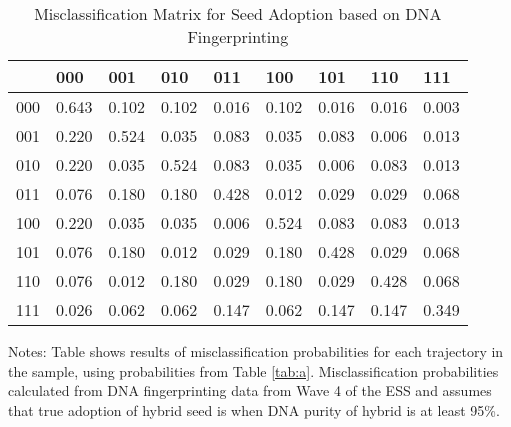 \begin{table}
\caption{Misclassification Matrix for Seed Adoption based on DNA Fingerprinting}
\label{tab:cm}
\centering
\begin{tabular}{lllllllll}
\toprule
 & 000 & 001 & 010 & 011 & 100 & 101 & 110 & 111 \\
\midrule
000 & 0.643 & 0.102 & 0.102 & 0.016 & 0.102 & 0.016 & 0.016 & 0.003 \\
001 & 0.220 & 0.524 & 0.035 & 0.083 & 0.035 & 0.083 & 0.006 & 0.013 \\
010 & 0.220 & 0.035 & 0.524 & 0.083 & 0.035 & 0.006 & 0.083 & 0.013 \\
011 & 0.076 & 0.180 & 0.180 & 0.428 & 0.012 & 0.029 & 0.029 & 0.068 \\
100 & 0.220 & 0.035 & 0.035 & 0.006 & 0.524 & 0.083 & 0.083 & 0.013 \\
101 & 0.076 & 0.180 & 0.012 & 0.029 & 0.180 & 0.428 & 0.029 & 0.068 \\
110 & 0.076 & 0.012 & 0.180 & 0.029 & 0.180 & 0.029 & 0.428 & 0.068 \\
111 & 0.026 & 0.062 & 0.062 & 0.147 & 0.062 & 0.147 & 0.147 & 0.349 \\
\bottomrule
\end{tabular}
\begin{tablenotes}
    \item \footnotesize Notes: Table shows results of misclassification probabilities for each trajectory in the sample, using probabilities from Table \ref{tab:a}. Misclassification probabilities calculated from DNA fingerprinting data from Wave 4 of the ESS and assumes that true adoption of hybrid seed is when DNA purity of hybrid is at least 95\%.
\end{tablenotes}
\end{table}
